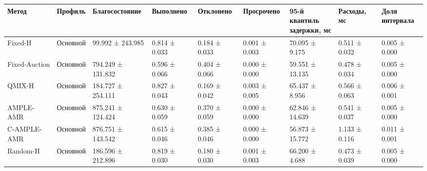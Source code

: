 \begin{tabular}{lllllllll}
\toprule
 Метод & Профиль & Благосостояние & Выполнено & Отклонено & Просрочено & \shortstack{95-й квантиль\\задержки, мс} & Расходы, мс & \shortstack{Доля\\интервала} \\
\midrule
 Fixed-H & Основной & 99.992 ± 243.985 & 0.814 ± 0.033 & 0.184 ± 0.033 & 0.001 ± 0.003 & 70.095 ± 9.175 & 0.511 ± 0.032 & 0.005 ± 0.000 \\
 Fixed-Auction & Основной & 794.249 ± 131.832 & 0.596 ± 0.066 & 0.404 ± 0.066 & 0.000 ± 0.000 & 59.551 ± 13.135 & 0.478 ± 0.034 & 0.005 ± 0.000 \\
 QMIX-H & Основной & 184.727 ± 254.111 & 0.827 ± 0.043 & 0.169 ± 0.042 & 0.003 ± 0.005 & 65.437 ± 8.956 & 0.566 ± 0.063 & 0.006 ± 0.001 \\
 AMPLE-AMR & Основной & 875.241 ± 124.424 & 0.630 ± 0.059 & 0.370 ± 0.059 & 0.000 ± 0.000 & 62.846 ± 14.639 & 0.541 ± 0.037 & 0.005 ± 0.000 \\
 C-AMPLE-AMR & Основной & 876.751 ± 143.542 & 0.615 ± 0.046 & 0.385 ± 0.046 & 0.000 ± 0.000 & 56.873 ± 15.772 & 1.133 ± 0.116 & 0.011 ± 0.001 \\
 Random-H & Основной & 186.596 ± 212.896 & 0.819 ± 0.030 & 0.180 ± 0.030 & 0.001 ± 0.003 & 66.200 ± 4.688 & 0.473 ± 0.039 & 0.005 ± 0.000 \\
\bottomrule
\end{tabular}
